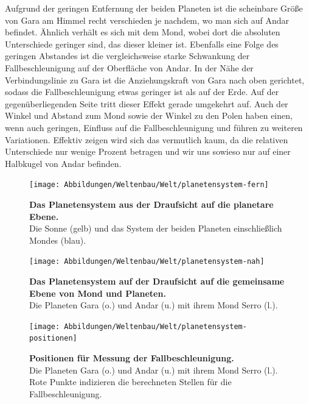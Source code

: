 \begin{outline}
	\1 Aufgrund der geringen Entfernung der beiden Planeten ist die scheinbare Größe von Gara am Himmel recht verschieden je nachdem, wo man sich auf Andar befindet. Ähnlich verhält es sich mit dem Mond, wobei dort die absoluten Unterschiede geringer sind, das dieser kleiner ist.
	\1 Ebenfalls eine Folge des geringen Abstandes ist die vergleichsweise starke Schwankung der Fallbeschleunigung auf der Oberfläche von Andar. In der Nähe der Verbindungslinie zu Gara ist die Anziehungskraft von Gara nach oben gerichtet, sodass die Fallbeschleunigung etwas geringer ist als auf der Erde. Auf der gegenüberliegenden Seite tritt dieser Effekt gerade umgekehrt auf. Auch der Winkel und Abstand zum Mond sowie der Winkel zu den Polen haben einen, wenn auch geringen, Einfluss auf die Fallbeschleunigung und führen zu weiteren Variationen. Effektiv zeigen wird sich das vermutlich kaum, da die relativen Unterschiede nur wenige Prozent betragen und wir uns sowieso nur auf einer Halbkugel von Andar befinden.
\end{outline}

\begin{figure}[tbh]
	\centering
	\texttt{[image: Abbildungen/Weltenbau/Welt/planetensystem-fern]}
	\caption[Planetensystem Skizzen 1]{\textbf{Das Planetensystem aus der Draufsicht auf die planetare Ebene.}\\
	Die Sonne (gelb) und das System der beiden Planeten einschließlich Mondes (blau).}
	\label{fig:planetensystem-nah}
\end{figure}

\begin{figure}[tbh]
	\centering
	\texttt{[image: Abbildungen/Weltenbau/Welt/planetensystem-nah]}
	\caption[Planetensystem Skizzen 2]{\textbf{Das Planetensystem auf der Draufsicht auf die gemeinsame Ebene von Mond und Planeten.}\\
	Die Planeten Gara (o.) und Andar (u.) mit ihrem Mond Serro (l.).}
	\label{fig:planetensystem-fern}
\end{figure}

\begin{figure}[tbh]
	\centering
	\texttt{[image: Abbildungen/Weltenbau/Welt/planetensystem-positionen]}
	\caption[Planetensystem Skizzen 3]{\textbf{Positionen für Messung der Fallbeschleunigung.}\\
	Die Planeten Gara (o.) und Andar (u.) mit ihrem Mond Serro (l.). Rote Punkte indizieren die berechneten Stellen für die Fallbeschleunigung.}
	\label{fig:planetensystem-positionen}
\end{figure}

